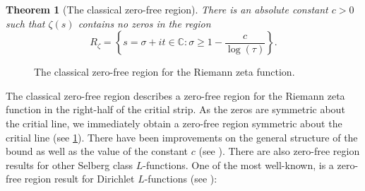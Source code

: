 \documentclass[12pt]{book}
\newtheorem{theorem}{Theorem}[section]
\theoremstyle{definition}\newframedtheorem{method}{Method}
\newcommand{\C}{\mathbb{C}}
\newcommand{\z}{\zeta}
\newcommand{\s}{\sigma}
\newcommand{\<}{\langle}
\renewcommand{\>}{\rangle}
\begin{document}
    \begin{theorem}[The classical zero-free region]
      There is an absolute constant $c > 0$ such that $\z(s)$ contains no zeros in the region
      \[
        R_{\z} = \left\{s = \s+it \in \C:\s \ge 1-\frac{c}{\log(\tau)}\right\}.
      \]
    \end{theorem}
 
    \begin{figure}[ht]
      \centering
      \caption{The classical zero-free region for the Riemann zeta function.}
      \label{fig:classical_zero-free_region}
    \end{figure}

     The classical zero-free region describes a zero-free region for the Riemann zeta function in the right-half of the critial strip. As the zeros are symmetric about the critial line, we immediately obtain a zero-free region symmetric about the critial line (see \cref{fig:classical_zero-free_region}). There have been improvements on the general structure of the bound as well as the value of the constant $c$ (see \cite{chudakov1938functions,littlewood1922researches,vinogradov1958new}). There are also zero-free region results for other Selberg class $L$-functions. One of the most well-known, is a zero-free region result for Dirichlet $L$-functions (see \cite{montgomery2007multiplicative}):
\end{document}
